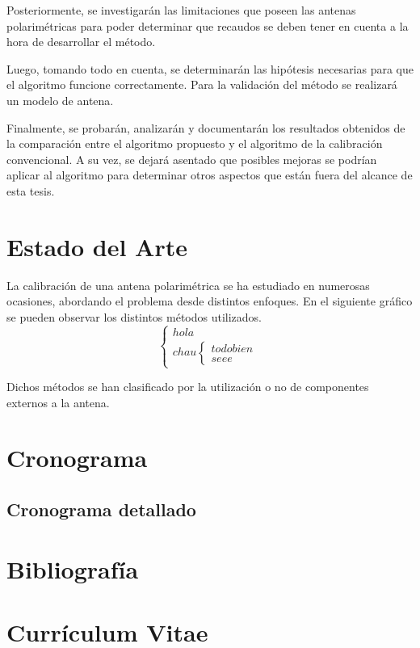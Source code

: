 \documentclass[a4paper,10pt]{article}
\begin{document}
		Posteriormente, se investigarán las limitaciones que poseen las antenas 
	polarimétricas para poder determinar que recaudos se deben tener en cuenta a
	la hora de desarrollar el método.

		Luego, tomando todo en cuenta, se determinarán las hipótesis necesarias
	para que el algoritmo funcione correctamente. Para la validación del método
	se realizará un modelo de antena.
		
		Finalmente, se probarán, analizarán y documentarán los resultados 
	obtenidos de la comparación entre el algoritmo propuesto y el algoritmo de
	la calibración convencional. A su vez, se dejará asentado que posibles 
	mejoras se podrían aplicar al algoritmo para determinar otros aspectos que
	están fuera del alcance de esta tesis.

	\section{Estado del Arte}
		La calibración de una antena polarimétrica se ha estudiado en numerosas 
	ocasiones, abordando el problema desde distintos enfoques. En el siguiente 
	gráfico se pueden observar los distintos métodos utilizados.
	\[
		\begin{cases}
			hola\\
			chau
			\begin{cases}
			todo bien\\
			seee
			\end{cases}
		\end{cases}
	\]



		Dichos métodos se han clasificado por la utilización o no de componentes
	externos a la antena.

	\section{Cronograma}
	\subsection{Cronograma detallado}

	\newpage
	\section{Bibliografía}

	\newpage
	\section{Currículum Vitae}
	
\end{document}
